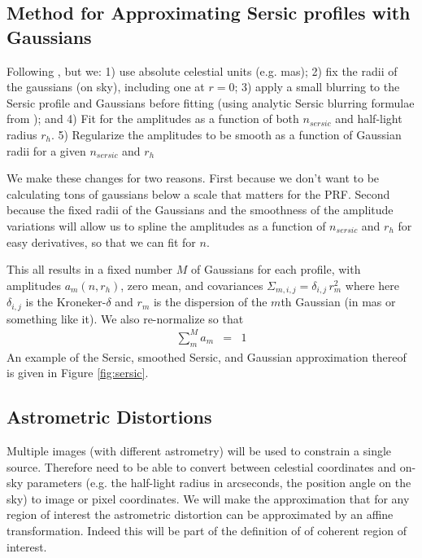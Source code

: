 \documentclass[modern]{aastex6}
\renewcommand{\det}[1]{||{#1}||}
\begin{document}
\subsection{Method for Approximating Sersic profiles with Gaussians}
Following \citet{hogg_mog}, but we: 
  1) use absolute celestial units (e.g. mas); 
  2) fix the radii of the gaussians (on sky), including one at $r=0$;
  3) apply a small blurring to the Sersic profile and Gaussians before fitting (using analytic Sersic blurring formulae from \citet{trujillo01}); and
  4) Fit for the amplitudes as a function of both $n_{sersic}$ and half-light radius $r_h$.
  5) Regularize the amplitudes to be smooth as a function of Gaussian radii  for a given $n_{sersic}$ and $r_h$

We make these changes for two reasons.
First because we don't want to be calculating tons of gaussians below a scale that matters for the PRF.
Second because the fixed radii of the Gaussians and the smoothness of the amplitude variations will allow us to spline the amplitudes as a function of $n_{sersic}$ and $r_h$ for easy derivatives, so that we can fit for $n$.

This all results in a fixed number $M$ of Gaussians for each profile,
with amplitudes $a_m(n, r_h)$, zero mean, and covariances $\Sigma_{m,i,j} = \delta_{i,j} \, r_m^2$ 
where here $\delta_{i,j}$ is the Kroneker-$\delta$ and $r_m$ is the dispersion  of the $m$th  Gaussian (in mas or something like it).
We also re-normalize so that 
\begin{eqnarray}
\sum_m^M a_m & = & 1
\end{eqnarray}
An example of the Sersic, smoothed Sersic, and Gaussian approximation thereof is given in Figure \ref{fig:sersic}.  


\subsection{Astrometric Distortions}
Multiple images (with different astrometry) will be used to constrain a single source.
Therefore need to be able to convert between celestial coordinates and on-sky parameters (e.g. the half-light radius in arcseconds, the position angle on the sky) to image or pixel coordinates.
We will make the approximation that for any region of interest the astrometric distortion can  be approximated by an affine transformation.
Indeed this will be part of the definition of of coherent region of interest.
\end{document}
